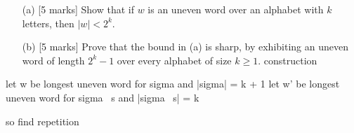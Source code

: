 \documentclass[12pt]{article}
\begin{document}
\begin{enumerate}
\begin{itemize} 

\item[(a)]  [5 marks] Show that if $w$ is an uneven word over an
alphabet with $k$ letters, then $|w| < 2^k$.

\item[(b)] [5 marks]  Prove that the bound in (a) is sharp, by
exhibiting an uneven word of length $2^k -1 $ over every alphabet of
size $k \geq 1$.
construction

\end{itemize}

let w be longest uneven word for sigma and |sigma| = k + 1
let w' be longest uneven word for sigma \ s and |sigma \ s| = k


so find repetition




\end{enumerate}
\end{document}
